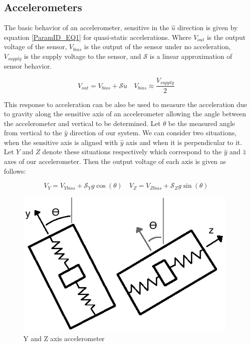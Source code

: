 \documentclass{article}
\theoremstyle{plain}
\theoremstyle{definition}
\theoremstyle{remark}
\newcommand{\Sens}{\mathcal{S}}
\begin{document}
\subsection*{Accelerometers}
The basic behavior of an accelerometer, sensitive in the $\hat{u}$ direction is given by equation \ref{ParamID_EQ1} for quasi-static accelerations.  Where $V_{out}$ is the output voltage of the sensor, $V_{bias}$ is the output of the sensor under no acceleration, $V_{supply}$ is the supply voltage to the sensor, and $\Sens$ is a linear approximation of sensor behavior.

\begin{equation}
V_{out} = V_{bias} + \Sens \ddot{u} \quad V_{bias} \approx \frac{V_{supply}}{2}
\label{ParamID_EQ1}
\end{equation}

This response to acceleration can be also be used to measure the acceleration due to gravity along the sensitive axis of an accelerometer allowing the angle between the accelerometer and vertical to be determined.  Let $\theta$ be the measured angle from vertical to the $\hat{y}$ direction of our system.  We can consider two situations, when the sensitive axis is aligned with $\hat{y}$ axis and when it is perpendicular to it.  Let $Y$ and $Z$ denote these situations respectively which correspond to the $\hat{y}$ and $\hat{z}$ axes of our accelerometer.  Then the output voltage of each axis is given as follows:

\begin{equation}
V_{Y} = V_{Ybias} + \Sens_{Y} g \cos(\theta) \quad V_{Z} = V_{Zbias} + \Sens_{Z} g \sin(\theta)
\label{ParamID_EQ2}
\end{equation}

\begin{figure}
\begin{center}
\includegraphics[width = 11cm]{Accelerometer_Cartoon.png}
\caption{Y and Z axis accelerometer}
\label{Accel_cartoon}
\end{center}
\end{figure}
\end{document}

